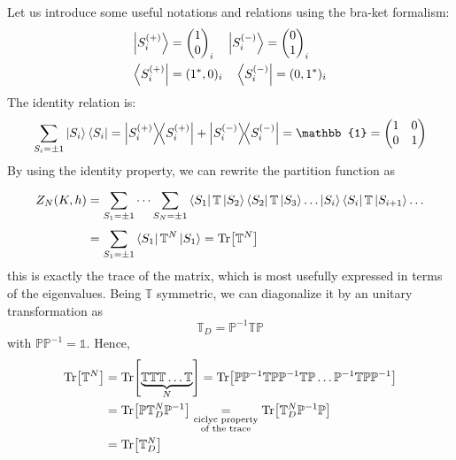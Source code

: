 \documentclass[../../Main/Main.tex]{subfiles}
\begin{document}
Let us introduce some useful notations and relations using the bra-ket formalism:
\begin{align}
  \ket{S_i^{(+)}} &= \begin{pmatrix}
  1 \\
  0
  \end{pmatrix}_i
  \quad
  \ket{S_i^{(-)}} = \begin{pmatrix}
  0 \\
  1
  \end{pmatrix}_i   \\
  \bra{S_i^{(+)}} &= (1^*,0)_i \quad   \bra{S_i^{(-)}} = (0,1^*)_i
\end{align}
The identity relation is:
\begin{equation}
  \sum_{S_i = \pm 1}^{}  \ket{S_i} \bra{S_i} =
  \ketbra{S_i^{(+)}}{S_i^{(+)}} + \ketbra{S_i^{(-)}}{S_i^{(-)}}
  =\mathbb{1} = \begin{pmatrix}
  1   & 0 \\
  0   & 1
  \end{pmatrix}
\end{equation}
By using the identity property, we can rewrite the partition function as 
\begin{equation}
  \begin{split}
   Z_N (K,h) &= \sum_{S_1 = \pm 1}^{} \dots \sum_{S_N = \pm 1}^{} \bra{S_1} \mathbb{T} \ket{S_2} \bra{S_2}  \mathbb{T} \ket{S_3} \dots \ket{S_i} \bra{S_i}  \mathbb{T} \ket{S_{i+1}} \dots \\
   & = \sum_{S_1 = \pm 1}^{}  \bra{S_1}  \mathbb{T}^N \ket{S_1} = \Tr[\mathbb{T}^N]
     \end{split}
\end{equation}
this is exactly the trace of the matrix, which is most usefully expressed in terms of the eigenvalues. Being \( \mathbb{T} \) symmetric, we can diagonalize it by an unitary transformation as
\begin{equation}
   \mathbb{T}_D = \mathbb{P}^{-1} \mathbb{T} \mathbb{P}
\end{equation}
with \( \mathbb{P} \mathbb{P}^{-1} = \mathbb{1} \). Hence,
\begin{equation*}
\begin{split}
  \Tr[\mathbb{T}^N] &= \Tr[\underbrace{\mathbb{T} \mathbb{T} \mathbb{T} \dots \mathbb{T}}_{N} ] = \Tr[ \mathbb{P} \mathbb{P}^{-1} \mathbb{T} \mathbb{P} \mathbb{P}^{-1} \mathbb{T} \mathbb{P} \dots \mathbb{P}^{-1}  \mathbb{T} \mathbb{P} \mathbb{P}^{-1} ]    \\
  & = \Tr[ \mathbb{P} \mathbb{T}_D^N \mathbb{P}^{-1}] \underset{\substack{ \text{ciclyc property} \\  \text{of the trace} } }{=} \Tr[ \mathbb{T}_D^N \mathbb{P}^{-1} \mathbb{P} ]\\
  & = \Tr[ \mathbb{T}_D^N]
\end{split}
\end{equation*}
\end{document}
